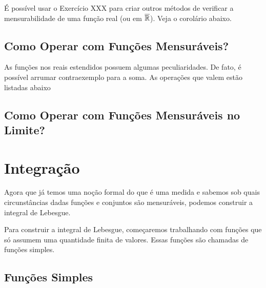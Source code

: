 É possível usar o Exercício XXX para criar outros métodos de verificar a mensurabilidade de uma função real (ou em $\overline{\mathbb{R}}$). Veja o corolário abaixo.

\measurableFunctionsInRExtend

\constantFunction
\characteristicFunction

\subsection*{Como Operar com Funções Mensuráveis?}
\measurableFunctionsOperations

As funções nos reais estendidos possuem algumas peculiaridades. De fato, é possível arrumar contraexemplo para a soma. As operações que valem estão listadas abaixo

\measurableFunctionsOperationsRExtend

\measurableFunctionsNotation

\subsection*{Como Operar com Funções Mensuráveis no Limite?}

\measurableFunctionsSequences











\section{Integração}

Agora que já temos uma noção formal do que é uma medida e sabemos sob quais circunstâncias dadas funções e conjuntos são mensuráveis, podemos construir a integral de Lebesgue.

Para construir a integral de Lebesgue, começaremos trabalhando com funções que só assumem uma quantidade finita de valores. Essas funções são chamadas de funções simples.

\subsection*{Funções Simples}

